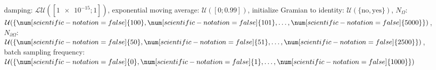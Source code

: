 damping: $\mathcal{LU}([\num[scientific-notation=true]{1e-15}; \num[scientific-notation=false]{1}])$, exponential moving average: $\mathcal{U}([\num[scientific-notation=false]{0}; \num[scientific-notation=true]{0.99}])$, initialize Gramian to identity: $\mathcal{U}(\{\text{no},\text{yes}\})$, $N_{\Omega}$: $\mathcal{U}(\{\num[scientific-notation=false]{100},\num[scientific-notation=false]{101},\text{\dots},\num[scientific-notation=false]{5000}\})$, $N_{\partial\Omega}$: $\mathcal{U}(\{\num[scientific-notation=false]{50},\num[scientific-notation=false]{51},\text{\dots},\num[scientific-notation=false]{2500}\})$, batch sampling frequency: $\mathcal{U}(\{\num[scientific-notation=false]{0},\num[scientific-notation=false]{1},\text{\dots},\num[scientific-notation=false]{1000}\})$